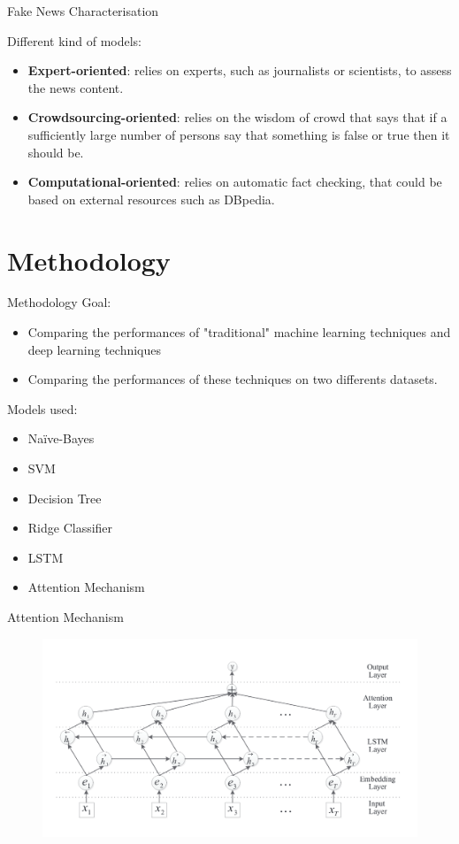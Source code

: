 \documentclass{beamer}
\begin{document}
\begin{frame}[allowframebreaks]{Fake News Characterisation}
\begin{figure}
	\end{figure}
	\newpage
  Different kind of models:
	  	\begin{itemize}
		 \item \textbf{Expert-oriented}: relies on experts, such as journalists or scientists, to assess the news content.
		 \item \textbf{Crowdsourcing-oriented}: relies on the wisdom of crowd that says that if a sufficiently large number of persons say that something is false or true then it should be.
		 \item \textbf{Computational-oriented}: relies on automatic fact checking, that could be based on external resources such as DBpedia.
		\end{itemize}
		\note{}
	\end{frame}
	\section{Methodology}
	\begin{frame}[allowframebreaks]{Methodology}
		Goal:
		\begin{itemize}
			\item Comparing the performances of "traditional" machine learning techniques and deep learning techniques
			\item Comparing the performances of these techniques on two differents datasets.
		\end{itemize}
		\note{}
		\newpage
		Models used:
		\begin{itemize}
			\item Na\"ive-Bayes
			\item SVM
			\item Decision Tree
			\item Ridge Classifier
			\item LSTM
			\item Attention Mechanism\cite{zhou-etal-2016-attention}
		\end{itemize}
		\note{}
	\end{frame}
	\begin{frame}[allowframebreaks]{Attention Mechanism}
		\begin{figure}
		 \includegraphics[scale=0.25]{attention}
	\end{figure}
	\note{}
	\end{frame}
\end{document}
